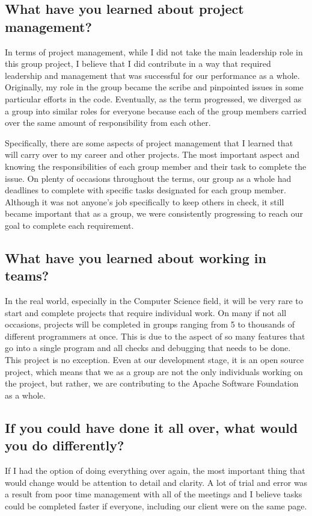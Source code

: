 \documentclass[draftclsnofoot,10pt,onecolumn]{IEEEtran} %
\begin{document}
\subsection{What have you learned about project management?}
In terms of project management, while I did not take the main leadership role in
this group project, I believe that I did contribute in a way that required
leadership and management that was successful for our performance as a whole.
Originally, my role in the group became the scribe and pinpointed issues in some
particular efforts in the code. Eventually, as the term progressed, we diverged
as a group into similar roles for everyone because each of the group members
carried over the same amount of responsibility from each other.

Specifically, there are some aspects of project management that I learned that
will carry over to my career and other projects. The most important aspect and
knowing the responsibilities of each group member and their task to complete the
issue. On plenty of occasions throughout the terms, our group as a whole had
deadlines to complete with specific tasks designated for each group member.
Although it was not anyone's job specifically to keep others in check, it still
became important that as a group, we were consistently progressing to reach our
goal to complete each requirement.

\subsection{What have you learned about working in teams?}
In the real world, especially in the Computer Science field, it will be very
rare to start and complete projects that require individual work. On many if not
all occasions, projects will be completed in groups ranging from 5 to thousands
of different programmers at once. This is due to the aspect of so many features
that go into a single program and all checks and debugging that needs to be
done. This project is no exception. Even at our development stage, it is an open
source project, which means that we as a group are not the only individuals
working on the project, but rather, we are contributing to the Apache Software
Foundation as a whole.

\subsection{If you could have done it all over, what would you do differently?}
If I had the option of doing everything over again, the most important thing
that would change would be attention to detail and clarity. A lot of trial and
error was a result from poor time management with all of the meetings and I
believe tasks could be completed faster if everyone, including our client were
on the same page.
\end{document}
